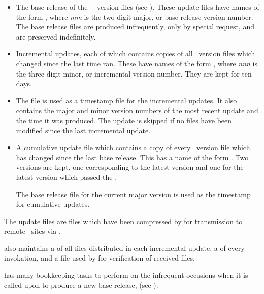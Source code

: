 \begin{itemize}
\item
   The base release of the \aipspp\ \rcs\ version files (see ).
   These update files have names of the form
   , where \textit{mm} is the two-digit
   major, or base-release version number.  The base release files are produced
   infrequently, only by special request, and are preserved indefinitely.

\item
   Incremental updates, each of which contains copies of all \rcs\ version
   files which changed since the last time  ran.  These have names
   of the form , where
   \textit{nnn} is the three-digit minor, or incremental version number.  They
   are kept for ten days.

\item
   The  file is used as a timestamp file for the incremental
   updates.  It also contains the major and minor version numbers of the most
   recent update and the time it was produced.  The update is skipped if no
   files have been modified since the last incremental update.

\item
   A cumulative update file which contains a copy of every \rcs\ version file
   which has changed since the last base release.  This has a name of the form
   .  Two versions are kept,
   one corresponding to the latest version and one for the latest version
   which passed the .

   The base release file for the current major version is used as the
   timestamp for cumulative updates.
\end{itemize}

\noindent
The update files are  files which have been compressed by
 for transmission to remote \aipspp\ sites via .

 also maintains a  of all files distributed in each
incremental update, a  of every invokation, and a 
file used by  for verification of received files.

 has many bookkeeping tasks to perform on the infrequent occasions
when it is called upon to produce a new base release, 
(see ):

